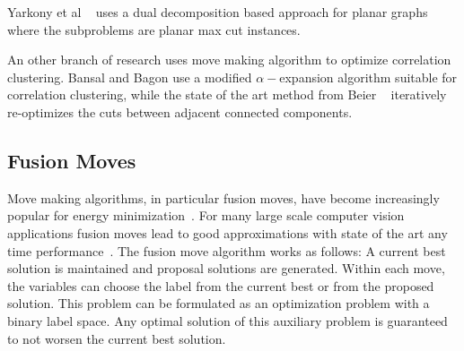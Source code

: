 \documentclass[10pt,twocolumn,letterpaper]{article}
\begin{document}
Yarkony et al ~\cite{yarkony_2012_eccv} uses 
a dual decomposition based approach for planar graphs
where the subproblems are planar max cut instances.

An other branch of research uses move making algorithm 
to optimize correlation clustering.
Bansal and Bagon use a modified $\alpha-$expansion \cite{bansal_2004_ml} 
algorithm suitable for correlation clustering,
while the state of the art method from  Beier \etal~\cite{beier_2014_cvpr} iteratively re-optimizes the cuts
between adjacent connected components.



\subsection{Fusion Moves}\label{sec:fm}
Move making algorithms, in particular fusion moves, 
have become increasingly popular for energy minimization~\cite{???,kappes_2014_ws}.
For many large scale computer vision applications fusion moves lead to good approximations
with state of the art any time performance~\cite{kappes_2014_ws}.
The fusion move algorithm works as follows:
A current best solution is maintained and proposal solutions 
are generated.
Within each move, the variables can choose the label from the current best or from the 
proposed solution. This problem can be formulated as an 
optimization problem with a binary label space.
Any optimal solution of this auxiliary problem is guaranteed
to not worsen the current best solution.



\end{document}
